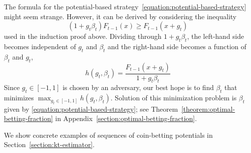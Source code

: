 The formula for the potential-based
strategy~\eqref{equation:potential-based-strategy} might seem strange. However,
it can be derived by considering the inequality
$$
(1+g_t\beta_t) F_{t-1}(x) \ge F_{t-1}(x + g_t)
$$
used in the induction proof above. Dividing through $1+g_t\beta_t$, the left-hand
side becomes independent of $g_t$ and $\beta_t$ and the right-hand side becomes
a function of $\beta_t$ and $g_t$,
$$
h(g_t, \beta_t) = \frac{F_{t-1}(x + g_t)}{1 + g_t\beta_t}
$$
Since $g_t \in [-1,1]$ is chosen by an adversary, our best hope is to find
$\beta_t$ that minimizes $\max_{g_t \in [-1,1]} h(g_t,\beta_t)$. Solution of
this minimization problem is $\beta_t$ given by
\eqref{equation:potential-based-strategy}; see
Theorem~\ref{theorem:optimal-betting-fraction} in
Appendix~\ref{section:optimal-betting-fraction}.

We show concrete examples of sequences of coin-betting potentials in
Section~\ref{section:kt-estimator}.
